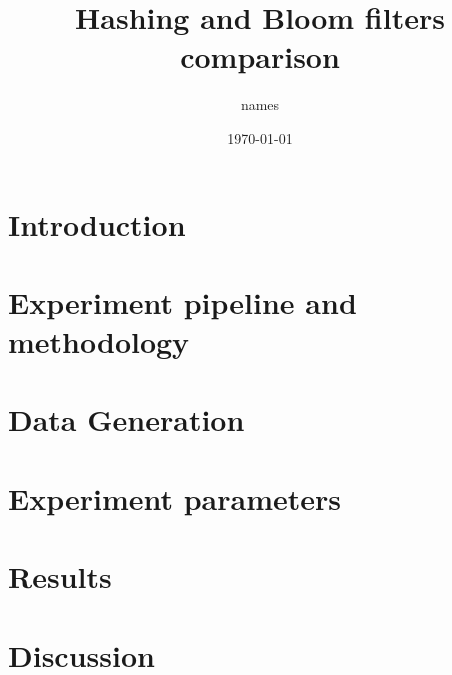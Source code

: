 \documentclass{article}
\title{Hashing and Bloom filters comparison}
\author{names}
\date{\today}
\begin{document}
    \maketitle
    \thispagestyle{empty}
    \begin{abstract}
        \lipsum[1]
    \end{abstract}


    \section*{Introduction}
        \lipsum[2]

    \section*{Experiment pipeline and methodology}
        \lipsum[2]
    \section*{Data Generation}
        \lipsum[1]
    \section*{Experiment parameters}
        \lipsum[1]
    \section*{Results}

    \section*{Discussion}
        \lipsum[1]


    \printbibliography
\end{document}
